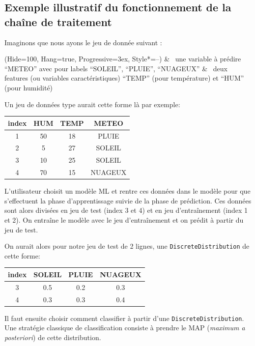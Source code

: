 \subsection{Exemple illustratif du fonctionnement de la chaîne de traitement}

Imaginons que nous ayons le jeu de donnée suivant : 
\begin{easylist}
\ListProperties(Hide=100, Hang=true, Progressive=3ex, Style*=--)
& ~une variable à prédire “METEO” avec pour labels “SOLEIL”, “PLUIE”, “NUAGEUX”
& ~deux features (ou variables caractéristiques) “TEMP” (pour température) et “HUM” (pour humidité)
\end{easylist}

Un jeu de données type aurait cette forme là par exemple:

\begin{center}
\begin{tabular}{cccc}
\rowcolor[RGB]{200, 200, 200}index & HUM & TEMP & METEO \\
\hline
1 & 50 & 18 & PLUIE \\
2 & 5 & 27 & SOLEIL \\
3 & 10 & 25 & SOLEIL \\
4 & 70 & 15 & NUAGEUX

\end{tabular}
\label{tab1}
\end{center}

L’utilisateur choisit un modèle ML et rentre ces données dans le modèle pour que s’effectuent la phase d’apprentissage suivie de la phase de prédiction.
Ces données sont alors divisées en jeu de test (index 3 et 4) et en jeu d’entraînement (index 1 et 2). On entraîne le modèle avec le jeu d’entraînement et on prédit à partir du jeu de test.

On aurait alors pour notre jeu de test de 2 lignes, une \texttt{DiscreteDistribution} de cette forme:

\begin{center}
\begin{tabular}{cccc}
\rowcolor[RGB]{200, 200, 200}index & SOLEIL & PLUIE & NUAGEUX \\
\hline
3 & 0.5 & 0.2 & 0.3 \\
4 & 0.3 & 0.3 & 0.4

\end{tabular}
\label{tab2}
\end{center}

Il faut ensuite choisir comment classifier à partir d’une \texttt{DiscreteDistribution}. Une stratégie classique de classification consiste à prendre le MAP (\textit{maximum a posteriori}) de cette distribution.

